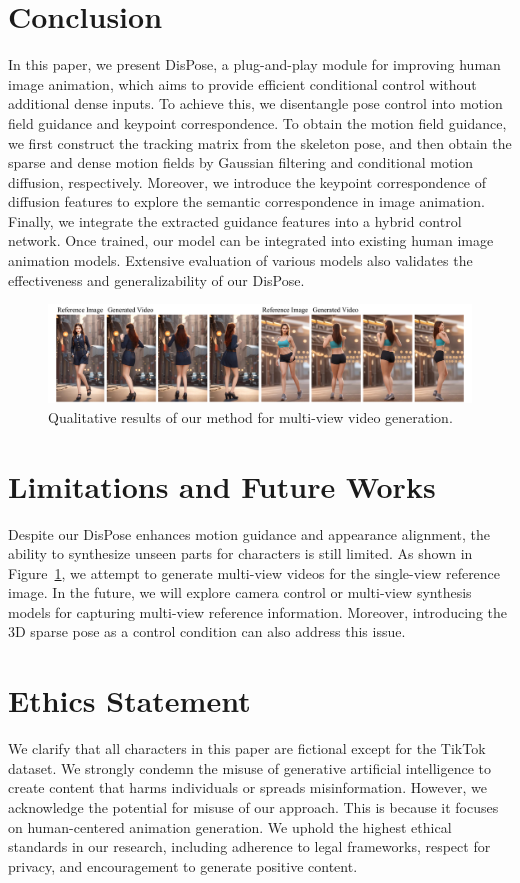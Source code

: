 \section{Conclusion} 
In this paper, we present DisPose, a plug-and-play module for improving human image animation, which aims to provide efficient conditional control without additional dense inputs. To achieve this, we disentangle pose control into motion field guidance and keypoint correspondence. To obtain the motion field guidance, we first construct the tracking matrix from the skeleton pose, and then obtain the sparse and dense motion fields by Gaussian filtering and conditional motion diffusion, respectively. Moreover, we introduce the keypoint correspondence of diffusion features to explore the semantic correspondence in image animation. 
 Finally, we integrate the extracted guidance features into a hybrid control network. Once trained, our model can be integrated into existing human image animation models. Extensive evaluation of various models also validates the effectiveness and generalizability of our DisPose.

\begin{figure}[t]
    \centering
    \includegraphics[width=1.0\columnwidth]{./image/limitation.pdf}
    \vspace{-15pt}
    \caption{Qualitative results of our method for multi-view video generation.}
    \label{fig: limitation}
\end{figure}

\section{Limitations and Future Works}
Despite our DisPose enhances motion guidance and appearance alignment, the ability to synthesize unseen parts for characters is still limited. As shown in Figure~\ref{fig: limitation}, we attempt to generate multi-view videos for the single-view reference image. In the future, we will explore camera control or multi-view synthesis models for capturing multi-view reference information. Moreover, introducing the 3D sparse pose as a control condition can also address this issue.
\section{Ethics Statement}
We clarify that all characters in this paper are fictional except for the TikTok~\citep{jafarian2021tiktok} dataset. We strongly condemn the misuse of generative artificial intelligence to create content that harms individuals or spreads misinformation. However, we acknowledge the potential for misuse of our approach. This is because it focuses on human-centered animation generation. We uphold the highest ethical standards in our research, including adherence to legal frameworks, respect for privacy, and encouragement to generate positive content.